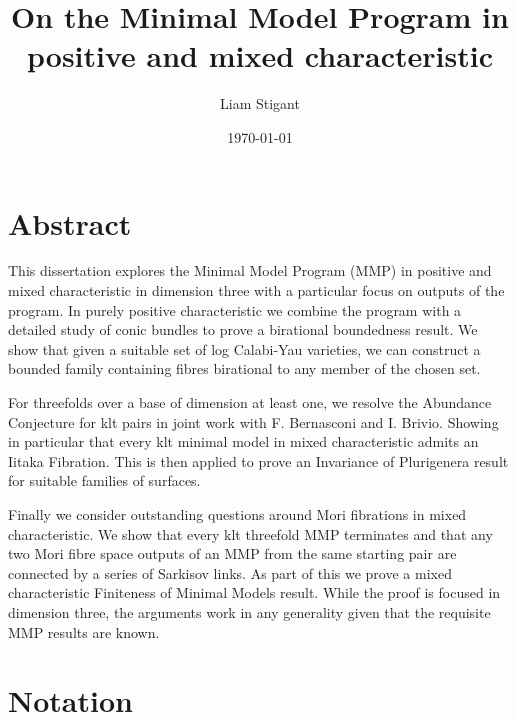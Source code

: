 \documentclass[a4paper,12pt]{book}
\begin{document}
	\title{On the Minimal Model Program in positive and mixed characteristic}
	\author{Liam Stigant}
	\date{\today}
	\maketitle
	\chapter*{Abstract}
		
		This dissertation explores the Minimal Model Program (MMP) in positive and mixed characteristic in dimension three with a particular focus on outputs of the program. In purely positive characteristic we combine the program with a detailed study of conic bundles to prove a birational boundedness result. We show that given a suitable set of log Calabi-Yau varieties, we can construct a bounded family containing fibres birational to any member of the chosen set.
		
		For threefolds over a base of dimension at least one, we resolve the Abundance Conjecture for klt pairs in joint work with F. Bernasconi and I. Brivio. Showing in particular that every klt minimal model in mixed characteristic admits an Iitaka Fibration. This is then applied to prove an Invariance of Plurigenera result for suitable families of surfaces.
		
		Finally we consider outstanding questions around Mori fibrations in mixed characteristic. We show that every klt threefold MMP terminates and that any two Mori fibre space outputs of an MMP from the same starting pair are connected by a series of Sarkisov links. As part of this we prove a mixed characteristic Finiteness of Minimal Models result. While the proof is focused in dimension three, the arguments work in any generality given that the requisite MMP results are known.
		
	\tableofcontents
	
	\chapter*{Notation}
	
\end{document}
